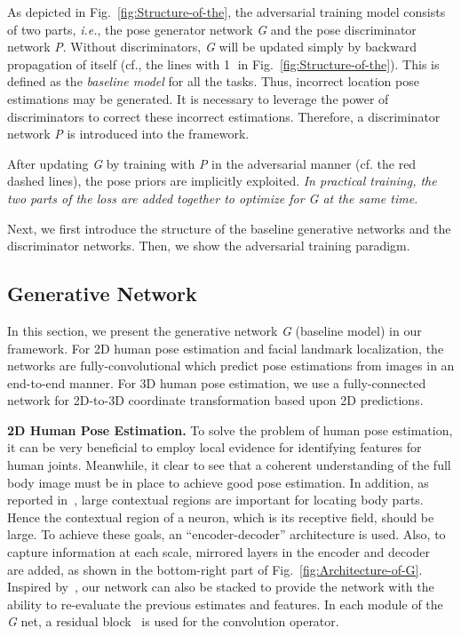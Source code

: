 \documentclass[10pt,journal,compsoc]{IEEEtran}
\begin{document}
%

%
%

As depicted in Fig.~\ref{fig:Structure-of-the}, the adversarial training model consists of two parts, \emph{i.e.},
the pose generator network \textit{G} and the pose discriminator network \textit{P}.
Without discriminators, \textit{G} will be updated simply by backward propagation of itself ({cf.}, the lines with \textcircled{1} in Fig.~\ref{fig:Structure-of-the}). This is defined as the {\it baseline model} for all the tasks.
Thus, incorrect location pose estimations may be generated.
It is necessary to leverage the power of discriminators to correct these incorrect estimations.
Therefore, a discriminator network \emph{P} is introduced into the framework.

After updating \textit{G} by training with \textit{P} in the adversarial manner (cf. the red dashed lines), the pose priors are implicitly exploited.
{\it In practical training, the two parts of the loss are added together to optimize for \textit{G} at the same time.}

Next, we first introduce the structure of the baseline generative networks and the discriminator networks. Then, we show the adversarial training paradigm.




\subsection{Generative Network}\label{subsec:Multi-task-Generative-Network}

In this section, we present the generative network \emph{G} (baseline model) in our framework. For 2D human pose estimation and facial landmark localization, the networks are fully-convolutional which predict pose estimations from images in an end-to-end manner. For 3D human pose estimation, we use a fully-connected network for 2D-to-3D coordinate transformation based upon 2D predictions.



\noindent \textbf{2D  Human  Pose Estimation.}
To solve the problem of human pose estimation, it can be very beneficial to employ local evidence
for identifying features for human joints.
Meanwhile, it clear to see that  a coherent understanding of the full body image must be in place to achieve good pose estimation.
In addition, as reported in~\cite{conf/cvpr/WeiRKS16}, large contextual regions are important for locating body parts.
Hence the contextual region of a neuron, which is its receptive field, should be large.
To achieve these goals, an ``encoder-decoder'' architecture is used.
Also, to capture information at each scale,  mirrored layers in the encoder and decoder ~\cite{conf/eccv/NewellYD16} are added, as shown in the bottom-right part of Fig.~\ref{fig:Architecture-of-G}.
Inspired by~\cite{conf/eccv/NewellYD16}, our network can also  be  stacked   to provide the network with the ability  to re-evaluate the previous estimates and features.
In each module of the \textit{G} net, a residual block~\cite{conf/cvpr/HeZRS16} is used for the convolution operator.
\end{document}
